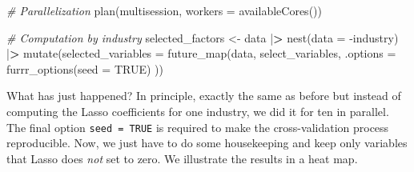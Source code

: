 \documentclass[
]{krantz}
\newenvironment{Shaded}{\begin{snugshade}}{\end{snugshade}}
\newcommand{\AttributeTok}[1]{\textcolor[rgb]{0.61,0.61,0.61}{#1}}
\newcommand{\CommentTok}[1]{\textcolor[rgb]{0.37,0.37,0.37}{\textit{#1}}}
\newcommand{\ConstantTok}[1]{\textcolor[rgb]{0,0,0}{#1}}
\newcommand{\ErrorTok}[1]{\textcolor[rgb]{0.14,0.14,0.14}{\textbf{#1}}}
\newcommand{\FunctionTok}[1]{\textcolor[rgb]{0,0,0}{#1}}
\newcommand{\NormalTok}[1]{#1}
\newcommand{\OtherTok}[1]{\textcolor[rgb]{0.37,0.37,0.37}{#1}}
\newcommand{\SpecialCharTok}[1]{\textcolor[rgb]{0,0,0}{#1}}
\begin{document}
\begin{Shaded}
\begin{Highlighting}[]
\CommentTok{\# Parallelization}
\FunctionTok{plan}\NormalTok{(multisession, }\AttributeTok{workers =} \FunctionTok{availableCores}\NormalTok{())}

\CommentTok{\# Computation by industry}
\NormalTok{selected\_factors }\OtherTok{\textless{}{-}}\NormalTok{ data }\SpecialCharTok{|}\ErrorTok{\textgreater{}}
  \FunctionTok{nest}\NormalTok{(}\AttributeTok{data =} \SpecialCharTok{{-}}\NormalTok{industry) }\SpecialCharTok{|}\ErrorTok{\textgreater{}}
  \FunctionTok{mutate}\NormalTok{(}\AttributeTok{selected\_variables =} \FunctionTok{future\_map}\NormalTok{(data, select\_variables,}
    \AttributeTok{.options =} \FunctionTok{furrr\_options}\NormalTok{(}\AttributeTok{seed =} \ConstantTok{TRUE}\NormalTok{)}
\NormalTok{  ))}
\end{Highlighting}
\end{Shaded}

What has just happened? In principle, exactly the same as before but instead of computing the Lasso coefficients for one industry, we did it for ten in parallel. The final option \texttt{seed\ =\ TRUE} is required to make the cross-validation process reproducible.
Now, we just have to do some housekeeping and keep only variables that Lasso does \emph{not} set to zero. We illustrate the results in a heat map.
\end{document}
